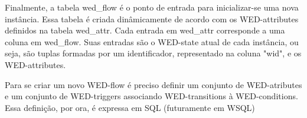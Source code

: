   Finalmente, a tabela wed_flow é o ponto de entrada para inicializar-se uma nova instância. Essa tabela é criada dinâmicamente
de acordo com os WED-attributes definidos na tabela wed_attr. Cada entrada em wed_attr corresponde a uma coluna em wed_flow.
Suas entradas são o WED-state atual de cada instância, ou seja, são tuplas formadas por um identificador, representado
na coluna "wid", e os WED-attributes. 
  

 
  Para se criar um novo WED-flow é preciso definir um conjunto de WED-atributes e um conjunto de WED-triggers associando
WED-transitions à WED-conditions. Essa definição, por ora, é expressa em SQL (futuramente em WSQL)
  
  


 





  

 
    
